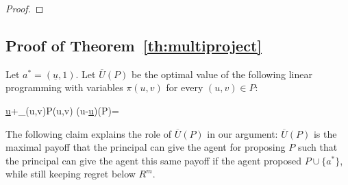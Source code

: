 \documentclass[12pt,english]{article}
\newcommand{\under}{\underline}
\newcommand{\overU}{{\overline{U}}}
\newcommand{\underu}{{\underline{u}}}
\theoremstyle{remark}
\theoremstyle{plain}
\theoremstyle{definition}
\begin{document}
\begin{proof}
\end{proof} 


\subsection{Proof of Theorem~\ref{th:multiproject}}
Let $a^\ast=(\underu, 1)$. Let $\overU(P)$ be the optimal value of the following linear programming with variables $\pi(u,v)$ for every $(u,v)\in P$:
\begin{maxi!}[2]{\pi}{\under u+\sum_{(u,v)\in P}\pi(u,v) (u-\under u)}{\label{overu}}{\overU(P)=}
\end{maxi!}
The following claim explains the role of $\overU(P)$ in our argument: $\overU(P)$ is the maximal payoff that the principal can give the agent for proposing $P$ such that the principal can give the agent this same payoff if the agent proposed $P\cup \{a^\ast\}$, while still keeping regret below $R^m$.
\end{document}
